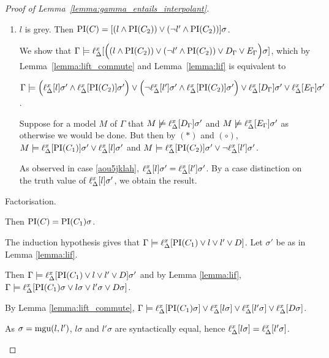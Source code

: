 \begin{proof}[Proof of Lemma~\ref{lemma:gamma_entails_interpolant}]
\begin{description}
\begin{enumerate}
				\item $l$ is grey. Then $\operatorname{PI}(C) = [(l \land \operatorname{PI}(C_2) ) \lor (\lnot l' \land \operatorname{PI}(C_2))]\sigma$.

					We show that $\Gamma \models \ell_{\Delta}^{x}[ \Big((l \land \operatorname{PI}(C_2) ) \lor (\lnot l' \land \operatorname{PI}(C_2)) \lor D_\Gamma \lor E_\Gamma\Big)\sigma]$, which by Lemma~\ref{lemma:lift_commute} and Lemma~\ref{lemma:lif} is equivalent to

					$\Gamma \models \Big(\ell_{\Delta}^{x}[l]\sigma' \land \ell_{\Delta}^{x}[\operatorname{PI}(C_2)]\sigma'\Big)\lor\Big(\lnot \ell_{\Delta}^{x}[l']\sigma' \land \ell_{\Delta}^{x}[\operatorname{PI}(C_2)]\sigma'\Big)\lor\ell_{\Delta}^{x}[D_\Gamma]\sigma' \lor \ell_{\Delta}^{x}[E_\Gamma]\sigma'$.

					Suppose for a model $M$ of $\Gamma$ that  $M \not\models \ell_{\Delta}^{x}[D_\Gamma]\sigma'$ and $M\not\models \ell_{\Delta}^{x}[E_\Gamma]\sigma'$ as otherwise we would be done.
					But then by $(*)$ and $(\circ)$,
					$M \models \ell_{\Delta}^{x}[\operatorname{PI}(C_1)]\sigma' \lor \ell_{\Delta}^{x}[l]\sigma'$ and
					$M \entails\nolinebreak \lifdelta{\PI(C_2)}\sigma' \lor \lnot\lifdelta{l'}\sigma'$.

					As observed in case \ref{aou5jklah}, $\ell_{\Delta}^{x}[l]\sigma' = \ell_{\Delta}^{x}[l']\sigma'$. By a case distinction on the truth value of $\ell_{\Delta}^{x}[l]\sigma'$, we obtain the result.



			\end{enumerate}

		\item{Factorisation.}
			\begin{prooftree}
			\end{prooftree}
			Then $\operatorname{PI}(C) = \operatorname{PI}(C_1)\sigma$.

			The induction hypothesis gives that
			$\Gamma \models \ell_{\Delta}^{x}[\operatorname{PI}(C_1) \lor l \lor l' \lor D]$.
			Let $\sigma'$ be as in Lemma \ref{lemma:lif}.

			Then $\Gamma \models \ell_{\Delta}^{x}[\operatorname{PI}(C_1) \lor l \lor l' \lor D]\sigma'$ and by Lemma \ref{lemma:lif},
			$\Gamma \models \ell_{\Delta}^{x}[\operatorname{PI}(C_1)\sigma \lor l\sigma \lor l'\sigma \lor D\sigma]$.

			By Lemma \ref{lemma:lift_commute},
			$\Gamma \models \ell_{\Delta}^{x}[\operatorname{PI}(C_1)\sigma] \lor \ell_{\Delta}^{x}[l\sigma] \lor \ell_{\Delta}^{x}[l'\sigma] \lor \ell_{\Delta}^{x}[D\sigma]$.

			As $\sigma = \operatorname{mgu}(l, l')$, $l\sigma$ and $l'\sigma$ are syntactically equal, hence $\ell_{\Delta}^{x}[l\sigma] = \ell_{\Delta}^{x}[l'\sigma]$.%


\end{description}
\end{proof}
